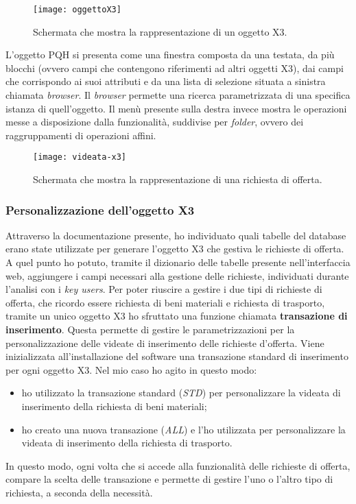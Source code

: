 \begin{figure}[htbp]
	\begin{center}
		\texttt{[image: oggettoX3]}
		\caption{Schermata che mostra la rappresentazione di un oggetto X3.}
	\end{center}
\end{figure}

\newpage

L'oggetto PQH si presenta come una finestra composta da una testata, da più blocchi (ovvero campi che contengono riferimenti ad altri oggetti X3), dai campi che corrispondo ai suoi attributi e da una lista di selezione situata a sinistra chiamata \textit{browser}. Il \textit{browser} permette una ricerca parametrizzata di una specifica istanza di quell'oggetto. Il menù presente sulla destra invece mostra le operazioni messe a disposizione dalla funzionalità, suddivise per \textit{folder}, ovvero dei raggruppamenti di operazioni affini.

\begin{figure}[htbp]
	\begin{center}
		\texttt{[image: videata-x3]}
		\caption{Schermata che mostra la rappresentazione di una richiesta di offerta.}
	\end{center}
\end{figure}


\subsubsection{Personalizzazione dell'oggetto X3}
Attraverso la documentazione presente, ho individuato quali tabelle del database erano state utilizzate per generare l'oggetto X3 che gestiva le richieste di offerta.
A quel punto ho potuto, tramite il dizionario delle tabelle presente nell'interfaccia web, aggiungere i campi necessari alla gestione delle richieste, individuati durante l'analisi con i \textit{key users}.
Per poter riuscire a gestire i due tipi di richieste di offerta, che ricordo essere richiesta di beni materiali e richiesta di trasporto, tramite un unico oggetto X3 ho sfruttato una funzione chiamata \textbf{transazione di inserimento}.
Questa permette di gestire le parametrizzazioni per la personalizzazione delle videate di inserimento delle richieste d'offerta.
Viene inizializzata all'installazione del software una transazione standard di inserimento per ogni oggetto X3. 
Nel mio caso ho agito in questo modo:
\begin{itemize}
	\item ho utilizzato la transazione standard (\textit{STD}) per personalizzare la videata di inserimento della richiesta di beni materiali;
	\item ho creato una nuova transazione (\textit{ALL}) e l'ho utilizzata per personalizzare la videata di inserimento della richiesta di trasporto.
\end{itemize}
In questo modo, ogni volta che si accede alla funzionalità delle richieste di offerta, compare la scelta delle transazione e permette di gestire l'uno o l'altro tipo di richiesta, a seconda della necessità.

